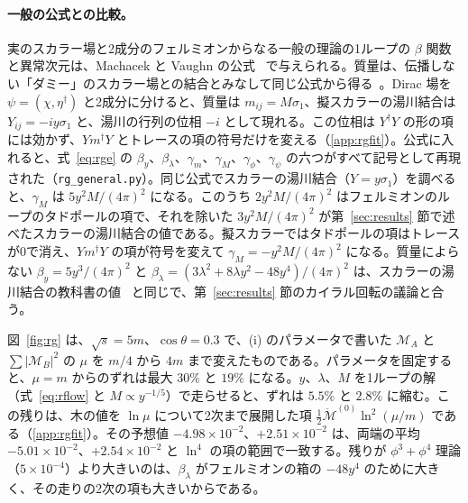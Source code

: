 \documentclass[a4paper,10pt]{ltjsarticle}
\begin{document}
\paragraph{一般の公式との比較。}実のスカラー場と2成分のフェルミオンからなる一般の理論の1ループの $\beta$ 関数と異常次元は、Machacek と Vaughn の公式~\cite{mv1,mv2,mv3} で与えられる。質量は、伝播しない「ダミー」のスカラー場との結合とみなして同じ公式から得る~\cite{luo}。Dirac 場を $\psi=(\chi,\eta^\dagger)$ と2成分に分けると、質量は $m_{ij}=M\sigma_1$、擬スカラーの湯川結合は $Y_{ij}=-iy\sigma_1$ と、湯川の行列の位相 $-i$ として現れる。この位相は $Y^\dagger Y$ の形の項には効かず、$Ym^\dagger Y$ とトレースの項の符号だけを変える（\ref{app:rgfit}）。公式に入れると、式~\eqref{eq:rge} の $\beta_y$、$\beta_\lambda$、$\gamma_m$、$\gamma_M$、$\gamma_\phi$、$\gamma_\psi$ の六つがすべて記号として再現された（\texttt{rg\_general.py}）。同じ公式でスカラーの湯川結合（$Y=y\sigma_1$）を調べると、$\gamma_M$ は $5y^2M/(4\pi)^2$ になる。このうち $2y^2M/(4\pi)^2$ はフェルミオンのループのタドポールの項で、それを除いた $3y^2M/(4\pi)^2$ が第~\ref{sec:results} 節で述べたスカラーの湯川結合の値である。擬スカラーではタドポールの項はトレースが0で消え、$Ym^\dagger Y$ の項が符号を変えて $\gamma_M=-y^2M/(4\pi)^2$ になる。質量によらない $\beta_y=5y^3/(4\pi)^2$ と $\beta_\lambda=(3\lambda^2+8\lambda y^2-48y^4)/(4\pi)^2$ は、スカラーの湯川結合の教科書の値~\cite{srednicki} と同じで、第~\ref{sec:results} 節のカイラル回転の議論と合う。

図~\ref{fig:rg} は、$\sqrt s=5m$、$\cos\theta=0.3$ で、(i) のパラメータで書いた $\mathcal M_A$ と $\sum|\mathcal M_B|^2$ の $\mu$ を $m/4$ から $4m$ まで変えたものである。パラメータを固定すると、$\mu=m$ からのずれは最大 $30\%$ と $19\%$ になる。$y$、$\lambda$、$M$ を1ループの解（式~\eqref{eq:rflow} と $M\propto y^{-1/5}$）で走らせると、ずれは $5.5\%$ と $2.8\%$ に縮む。この残りは、木の値を $\ln\mu$ について2次まで展開した項 $\frac12\ddot{\mathcal M}^{(0)}\ln^2(\mu/m)$ である（\ref{app:rgfit}）。その予想値 $-4.98\times10^{-2}$、$+2.51\times10^{-2}$ は、両端の平均 $-5.01\times10^{-2}$、$+2.54\times10^{-2}$ と $\ln^4$ の項の範囲で一致する。残りが $\phi^3+\phi^4$ 理論（$5\times10^{-4}$）より大きいのは、$\beta_\lambda$ がフェルミオンの箱の $-48y^4$ のために大きく、その走りの2次の項も大きいからである。
\end{document}
